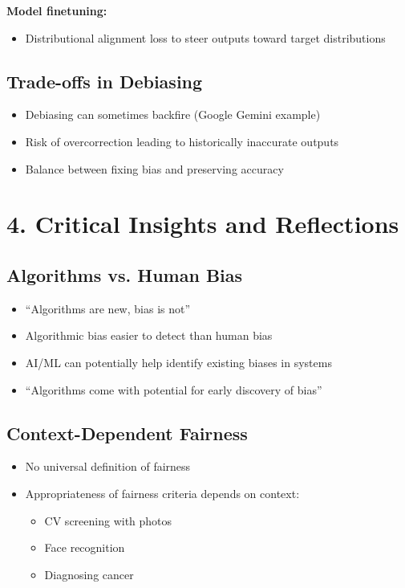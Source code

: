 \textbf{Model finetuning:}
\begin{itemize}
    \item Distributional alignment loss to steer outputs toward target distributions
\end{itemize}

\subsection*{Trade-offs in Debiasing}
\begin{itemize}
    \item Debiasing can sometimes backfire (Google Gemini example)
    \item Risk of overcorrection leading to historically inaccurate outputs
    \item Balance between fixing bias and preserving accuracy
\end{itemize}
\section*{4. Critical Insights and Reflections}

\subsection*{Algorithms vs. Human Bias}
\begin{itemize}
    \item ``Algorithms are new, bias is not''
    \item Algorithmic bias easier to detect than human bias
    \item AI/ML can potentially help identify existing biases in systems
    \item ``Algorithms come with potential for early discovery of bias''
\end{itemize}

\subsection*{Context-Dependent Fairness}
\begin{itemize}
    \item No universal definition of fairness
    \item Appropriateness of fairness criteria depends on context:
    \begin{itemize}
        \item CV screening with photos
        \item Face recognition
        \item Diagnosing cancer
    \end{itemize}
\end{itemize}

